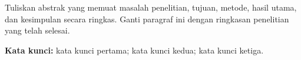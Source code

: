Tuliskan abstrak yang memuat masalah penelitian, tujuan, metode, hasil utama, dan kesimpulan secara ringkas. Ganti paragraf ini dengan ringkasan penelitian yang telah selesai.

\textbf{Kata kunci:} kata kunci pertama; kata kunci kedua; kata kunci ketiga.
